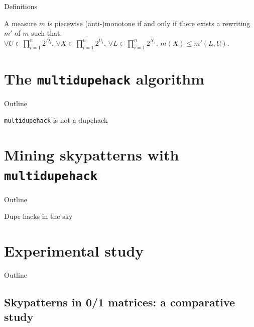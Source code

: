 \documentclass{beamer}
\newcommand{\mdh}{\texttt{multi\-dupe\-hack}}
\begin{document}
\begin{frame}[allowframebreaks]{Definitions}
\framebreak
  \begin{definition}
  A measure $m$ is piecewise (anti-)monotone if and only if there exists
  a rewriting $m'$ of $m$ such that:\\
  $\forall U \in \prod_{i = 1}^n 2^{D_i}$, $\forall X \in \prod_{i =
  1}^n 2^{U_i}$, $\forall L \in \prod_{i = 1}^n 2^{X_i}$, $m(X) \leq
  m'(L, U)$.
  \end{definition}


  
\end{frame}


\section{The \mdh{} algorithm}
\begin{frame}{Outline}
  \tableofcontents[currentsection]
\end{frame}

\begin{frame}{\mdh{} is not a dupehack}
  
\end{frame}

\section{Mining skypatterns with \mdh{}}
\begin{frame}{Outline}
  \tableofcontents[currentsection]
\end{frame}

\begin{frame}{Dupe hacks in the sky}
  
\end{frame}

\section{Experimental study}
\begin{frame}{Outline}
  \tableofcontents[currentsection]
\end{frame}

\subsection{Skypatterns in 0/1 matrices: a comparative study}
\end{document}

